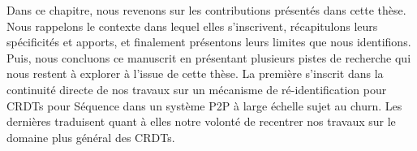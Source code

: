 Dans ce chapitre, nous revenons sur les contributions présentés dans cette thèse.
Nous rappelons le contexte dans lequel elles s'inscrivent, récapitulons leurs spécificités et apports, et finalement présentons leurs limites que nous identifions.
Puis, nous concluons ce manuscrit en présentant plusieurs pistes de recherche qui nous restent à explorer à l'issue de cette thèse.
La première s'inscrit dans la continuité directe de nos travaux sur un mécanisme de ré-identification pour \acp{CRDT} pour Séquence dans un système \ac{P2P} à large échelle sujet au churn.
Les dernières traduisent quant à elles notre volonté de recentrer nos travaux sur le domaine plus général des \acp{CRDT}.
